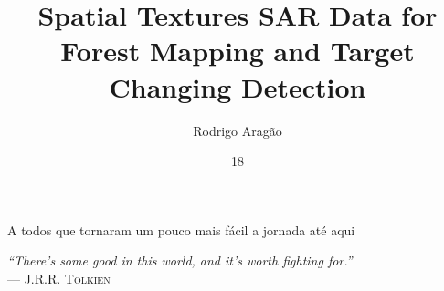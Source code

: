 \documentclass[msc, eng]{ita}    %
\author{Rodrigo Aragão}{Santos}
\title{Spatial Textures SAR Data for Forest Mapping and Target Changing Detection}
\date{18}{Novembro}{2021}
\begin{document}
\maketitle %

\begin{itadedication}
A todos que tornaram um pouco mais fácil a jornada até aqui
\end{itadedication}

\begin{itathanks}

\end{itathanks}

\thispagestyle{empty}
\ifhyperref{}\fi
\begin{flushright}
\begin{spacing}{1}
\mbox{}\vfill
{\sffamily\itshape
``There’s some good in this world, and it’s worth fighting for.''\\}
--- \textsc{J.R.R. Tolkien}
\end{spacing}
\end{flushright}

\begin{abstract}
\noindent

\end{abstract}

\begin{englishabstract}
\noindent

\end{englishabstract}

\listoffigures %


\listofabbreviations


\tableofcontents

\mainmatter

% 

% 

% 
\end{document}
